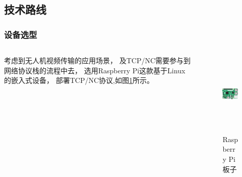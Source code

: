 \subsection{技术路线}
\begin{frame}
	\frametitle{设备选型}
	\begin{columns}
		\begin{column}{0.4\textwidth}
			考虑到无人机视频传输的应用场景，
			及TCP/NC需要参与到网络协议栈的流程中去，
			选用Raspberry Pi这款基于Linux的嵌入式设备，
			部署TCP/NC协议,如图\ref{fig:rasp}所示。

		\end{column}
		\begin{column}{0.5\textwidth}
			\begin{figure}
				\includegraphics[height=4cm]{figures/rasp.eps}
				\caption{Raspberry Pi板子}
				\label{fig:rasp}
			\end{figure}
		\end{column}
	\end{columns}
\end{frame}
